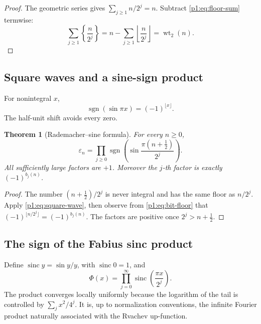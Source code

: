 \documentclass[11pt,oneside]{article}
\numberwithin{equation}{section}
\newtheorem{theorem}{Theorem}[section]
\theoremstyle{definition}
\theoremstyle{remark}
\newcommand{\sgn}{\operatorname{sgn}}
\newcommand{\sinc}{\operatorname{sinc}}
\newcommand{\wt}{\operatorname{wt}_2}
\newcommand{\eps}{\varepsilon}
\begin{document}
\begin{proof}
The geometric series gives \(\sum_{j\ge1}n/2^j=n\).  Subtract
\eqref{p1:eq:floor-sum} termwise:
\[
 \sum_{j\ge1}\left\{\frac n{2^j}\right\}
 =n-\sum_{j\ge1}\left\lfloor\frac n{2^j}\right\rfloor
 =\wt(n).
\]
\end{proof}

\subsection{Square waves and a sine-sign product}

For nonintegral \(x\),
\begin{equation}
  \sgn(\sin\pi x)=(-1)^{\lfloor x\rfloor}.
  \label{p1:eq:square-wave}
\end{equation}
The half-unit shift avoids every zero.

\begin{theorem}[Rademacher--sine formula]
\label{p1:thm:sine-sign}
For every \(n\ge0\),
\begin{equation}
  \boxed{
  \eps_n=\prod_{j\ge0}
  \sgn\!\left(
    \sin\frac{\pi(n+\tfrac12)}{2^j}
  \right).}
  \label{p1:eq:sine-sign}
\end{equation}
All sufficiently large factors are \(+1\).  Moreover the \(j\)-th factor is
exactly \((-1)^{b_j(n)}\).
\end{theorem}

\begin{proof}
The number \((n+\tfrac12)/2^j\) is never integral and has the same floor as
\(n/2^j\).  Apply \eqref{p1:eq:square-wave}, then observe from
\eqref{p1:eq:bit-floor} that
\((-1)^{\lfloor n/2^j\rfloor}=(-1)^{b_j(n)}\).  The factors are positive once
\(2^j>n+\tfrac12\).
\end{proof}

\subsection{The sign of the Fabius sinc product}
\label{p1:sec:sinc-sign}

Define \(\sinc y=\sin y/y\), with \(\sinc0=1\), and
\begin{equation}
  \Phi(x)=\prod_{j=0}^{\infty}
    \sinc\!\left(\frac{\pi x}{2^j}\right).
  \label{p1:eq:sinc-product}
\end{equation}
The product converges locally uniformly because the logarithm of the tail is
controlled by \(\sum_jx^2/4^j\).  It is, up to normalization conventions, the
infinite Fourier product naturally associated with the Rvachev up-function.
\end{document}
